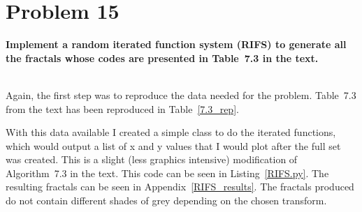 \section{Problem 15}
\textbf{
Implement a random iterated function system (RIFS) to generate all the fractals whose codes are presented in Table~7.3 in the text.
}

\hfill \\

Again, the first step was to reproduce the data needed for the problem. Table~7.3 from the text has been reproduced in Table~\ref{7.3_rep}.

With this data available I created a simple class to do the iterated functions, which would output a list of x and y values that I would plot after the full set was created. This is a slight (less graphics intensive) modification of Algorithm~7.3 in the text. This code can be seen in Listing~\ref{RIFS.py}. The resulting fractals can be seen in Appendix~\ref{RIFS_results}. The fractals produced do not contain different shades of grey depending on the chosen transform.

